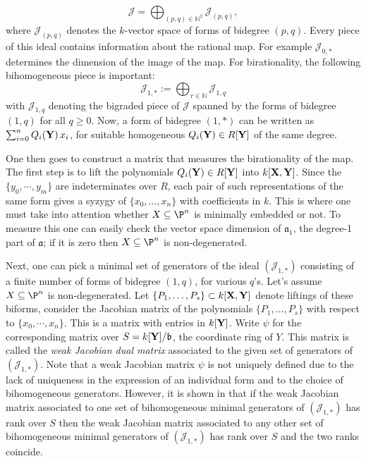 \documentclass[11pt]{amsart}%
\numberwithin{equation}{theorem}
\def\ff{{\bf f}}
\def\XX{{\bf X}}
\def\YY{{\bf Y}}
\renewcommand{\:}{\colon}
\DeclareMathOperator{\edim}{edim}
\theoremstyle{theorem}
\begin{document}

$${\mathcal J}=\bigoplus_{(p,q)\in \mathbb{N}^2} {\mathcal J}_{(p,q)},$$
where ${\mathcal J}_{(p,q)}$ denotes the $k$-vector space of forms of bidegree $(p,q)$.
Every piece of this ideal contains information about the rational map. For example ${\mathcal J}_{0,*}$ determines the dimension of the image of the map.
For birationality, the following bihomogeneous piece is  important:
$${\mathcal J}_{1,*}:=\bigoplus_{r\in\mathbb{N}} {\mathcal J}_{1,q}$$
with ${\mathcal J}_{1,q}$ denoting the bigraded piece of ${\mathcal J}$ spanned by the forms of bidegree
 $(1,q)$ for all $q\geq 0$. Now, a form of bidegree $(1,*)$ can be written as $\sum_{i=0}^n Q_i(\YY)\,x_i$, for suitable homogeneous $Q_i(\YY)\in  R[\YY]$
of the same degree.

One then goes to construct a matrix that  measures the birationality of the map. The first step is to lift the polynomials $Q_i(\YY)\in  R[\YY]$ into $k[\XX,\YY]$.
Since the $\{y_0,\cdots,y_m\}$ are indeterminates over $R$, each pair of such representations of the same form gives a syzygy of $\{x_0,\ldots,x_n\}$
with coefficients in $k$.  This is where one must take into attention whether $X\subseteq \P^n$ is minimally embedded  or not. To measure this one can easily check the vector space dimension of ${\mathfrak a}_1$, the degree-1 part of $\mathfrak a$; if it is zero  then $X\subseteq \P^n$ is non-degenerated.



Next, one can pick a minimal set of generators of the ideal $({\mathcal J}_{1,*})$ consisting of a finite number
of forms of bidegree $(1,q)$, for various $q$'s.
Let's assume  $X\subseteq \P^n$ is non-degenerated. Let $\{P_1,\ldots,P_s\}\subset k[\XX,\YY]$ denote liftings of these biforms,
 consider the Jacobian matrix of the polynomials $\{P_1,\ldots,P_s\}$ with respect to $\{x_0,\cdots,x_n\}$. This is a matrix with entries in $k[\YY]$.
Write $\psi$ for the corresponding matrix over $S=k[\YY]/{\mathfrak b}$, the coordinate ring of $Y$. This matrix is called   the \emph{weak Jacobian dual matrix}  associated to
the given set of generators of $({\mathcal J}_{1,*})$.
Note that a weak Jacobian matrix $\psi$ is not uniquely defined due to the lack of uniqueness in the expression of
an individual form and to the choice of bihomogeneous generators. However, it is shown in \cite[Lemma 2.13]{DoriaHassanzadehSimisBirationality} that if the weak Jacobian matrix associated  to one set of bihomogeneous minimal generators of
$({\mathcal J}_{1,*})$ has  rank over $S$ then the weak Jacobian matrix associated to any other
set of bihomogeneous minimal generators of
$({\mathcal J}_{1,*})$ has  rank over $S$ and the two ranks coincide.
\end{document}
